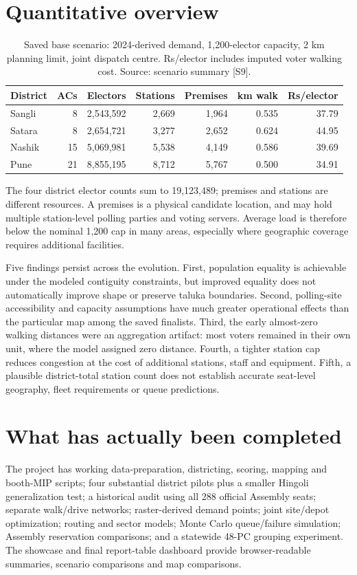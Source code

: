 \documentclass[11pt,a4paper,oneside]{report}
\begin{document}
\section{Quantitative overview}
\begin{table}[htbp]\centering
\small
\setlength{\tabcolsep}{5pt}
\caption{Saved base scenario: 2024-derived demand, 1,200-elector capacity, 2 km planning limit, joint dispatch centre. Rs/elector includes imputed voter walking cost. Source: scenario summary [S9].}
\begin{tabular}{lrrrrrr}
\toprule
District & ACs & Electors & Stations & Premises & km walk & Rs/elector\\
\midrule
Sangli & 8 & 2,543,592 & 2,669 & 1,964 & 0.535 & 37.79\\
Satara & 8 & 2,654,721 & 3,277 & 2,652 & 0.624 & 44.95\\
Nashik & 15 & 5,069,981 & 5,538 & 4,149 & 0.586 & 39.69\\
Pune & 21 & 8,855,195 & 8,712 & 5,767 & 0.500 & 34.91\\
\bottomrule\end{tabular}
\end{table}
The four district elector counts sum to 19,123,489; premises and stations are different resources. A premises is a physical candidate location, and may hold multiple station-level polling parties and voting servers. Average load is therefore below the nominal 1,200 cap in many areas, especially where geographic coverage requires additional facilities.

Five findings persist across the evolution. First, population equality is achievable under the modeled contiguity constraints, but improved equality does not automatically improve shape or preserve taluka boundaries. Second, polling-site accessibility and capacity assumptions have much greater operational effects than the particular map among the saved finalists. Third, the early almost-zero walking distances were an aggregation artifact: most voters remained in their own unit, where the model assigned zero distance. Fourth, a tighter station cap reduces congestion at the cost of additional stations, staff and equipment. Fifth, a plausible district-total station count does not establish accurate seat-level geography, fleet requirements or queue predictions.

\section{What has actually been completed}
The project has working data-preparation, districting, scoring, mapping and booth-MIP scripts; four substantial district pilots plus a smaller Hingoli generalization test; a historical audit using all 288 official Assembly seats; separate walk/drive networks; raster-derived demand points; joint site/depot optimization; routing and sector models; Monte Carlo queue/failure simulation; Assembly reservation comparisons; and a statewide 48-PC grouping experiment. The showcase and final report-table dashboard provide browser-readable summaries, scenario comparisons and map comparisons.
\end{document}
